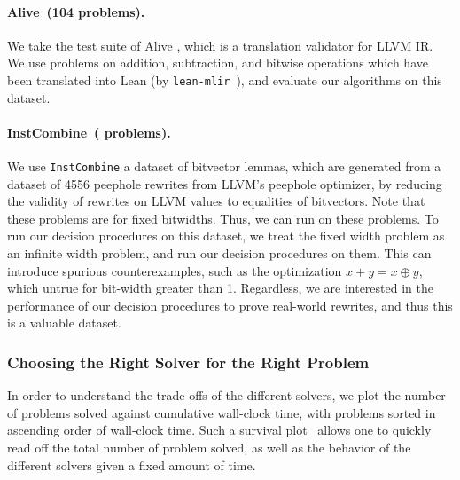 \noindent \paragraph{Alive~(104 problems).} We take the test suite of Alive \cite{lopes2015provably}, which is a translation validator for LLVM IR.
We use problems on addition, subtraction, and bitwise operations which have been translated into Lean (by \texttt{lean-mlir}~\cite{bhat2024verifying}),
and evaluate our algorithms on this dataset.
\noindent \paragraph{InstCombine~(\InstCombineTotalProblems{} problems).}
We use \texttt{InstCombine} a dataset of \InstCombineTotalProblems{} bitvector
lemmas, which are
generated from a dataset of 4556 peephole rewrites from LLVM's peephole optimizer, by
reducing the validity of rewrites on LLVM values to equalities of bitvectors.
%
Note that these problems are for fixed bitwidths.
%
Thus, we can run \bvdecide{} on these problems. To run our decision procedures on this dataset,
we treat the fixed width problem as an infinite width problem, and run our decision procedures on them.
This can introduce spurious counterexamples, such as the optimization $x + y = x \oplus y$, which untrue for bit-width greater than 1.
Regardless, we are interested in the performance of our decision procedures to prove real-world rewrites,
and thus this is a valuable dataset.

\subsubsection{Choosing the Right Solver for the Right Problem}

In order to understand the trade-offs of the different solvers,
we plot the number of problems solved against cumulative wall-clock time,
with problems sorted in ascending order of wall-clock time.
Such a survival plot~\cite{brain2017benchmarking} allows one to quickly read off the total number of problem solved,
as well as the behavior of the different solvers given a fixed amount of time.

